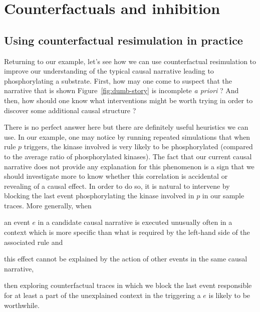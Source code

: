 
\section{Counterfactuals and inhibition}\label{sec:inhibition}

\subsection{Using counterfactual resimulation in practice}
\label{sec:practice}

Returning to our example, let's see how we can use counterfactual
resimulation to improve our understanding of the typical causal
narrative leading to phosphorylating a substrate. First, how may one
come to suspect that the narrative that is shown
Figure~\ref{fig:dumb-story} is incomplete \textit{a priori} ? And
then, how should one know what interventions might be worth trying in
order to discover some additional causal structure ?

There is no perfect answer here but there are definitely useful
heuristics we can use. In our example, one may notice by running
repeated simulations that when rule $p$ triggers, the kinase involved
is very likely to be phosphorylated (compared to the average ratio of
phosphorylated kinases). The fact that our current causal narrative
does not provide any explanation for this phenomenon is a sign that we
should investigate more to know whether this correlation is accidental
or revealing of a causal effect. In order to do so, it is natural to
intervene by blocking the last event phosphorylating the kinase
involved in $p$ in our sample traces. More generally, when
\begin{inparaenum}[(i)]
\item an event $e$ in a candidate causal narrative is executed
  unusually often in a context which is more specific than what is
  required by the left-hand side of the associated rule and
\item this effect cannot be explained by the action of other events in
  the same causal narrative,
\end{inparaenum}
then exploring counterfactual traces in which we block the last event
responsible for at least a part of the unexplained context in the
triggering a $e$ is likely to be worthwhile.

